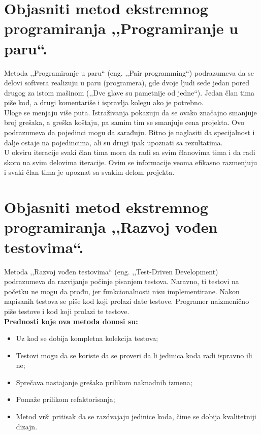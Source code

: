 \documentclass[a4paper]{article}
\begin{document}
\section{Objasniti metod ekstremnog programiranja ,,Programiranje u paru``.}
  Metoda ,,Programiranje u paru`` (eng. ,,Pair programming``) podrazumeva da se delovi
  softvera realizuju u paru (programera), gde dvoje ljudi sede jedan pored drugog za istom
  mašinom (,,Dve glave su pametnije od jedne``). Jedan član tima piše kod, a drugi komentariše
  i ispravlja kolegu ako je potrebno. \\
  \indent Uloge se menjaju više puta. Istraživanja pokazuju da
  se ovako značajno smanjuje broj grešaka, a greška koštaju, pa samim tim se smanjuje
  cena projekta. Ovo podrazumeva da pojedinci mogu da sarađuju. Bitno je naglasiti
  da specijalnost i dalje ostaje na pojedincima, ali su drugi ipak upoznati sa rezultatima.\\
  \indent U okviru iteracije svaki član tima mora da radi sa svim članovima tima i da radi skoro na
  svim delovima iteracije. Ovim se informacije veoma efikasno razmenjuju i svaki član tima je
  upoznat sa svakim delom projekta.\\

\section{Objasniti metod ekstremnog programiranja ,,Razvoj vođen testovima``.}
  Metoda ,,Razvoj vođen testovima`` (eng. ,,Test-Driven Development) podrazumeva da razvijanje
  počinje pisanjem testova. Naravno, ti testovi na početku ne mogu da prođu, jer funkcionalnosti
  nisu implementirane. Nakon napisanih testova se piše kod koji prolazi date testove. 
  Programer naizmenično piše testove i kod koji prolazi te testove. \\
  \textbf{Prednosti koje ova metoda donosi su:}
  \begin{itemize}
    \item Uz kod se dobija kompletna kolekcija testova;
    \item Testovi mogu da se koriste da se proveri da li jedinica koda radi ispravno ili ne;
    \item Sprečava nastajanje grešaka prilikom naknadnih izmena;
    \item Pomaže prilikom refaktorisanja;
    \item Metod vrši pritisak da se razdvajaju jedinice koda, čime se dobija kvalitetniji dizajn.
  \end{itemize}
\end{document}
